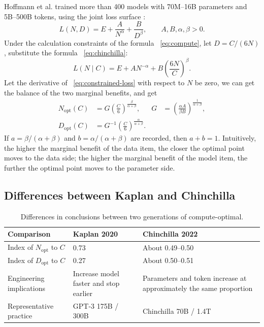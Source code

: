 \documentclass[UTF8,10pt,a4paper,fontset=none]{ctexart}
\begin{document}
Hoffmann et al. trained more than 400 models with 70M--16B parameters and 5B--500B tokens, using the joint loss surface \cite{hoffmann2022}:
\begin{equation}
  L(N,D)=E+\frac{A}{N^{\alpha}}+\frac{B}{D^{\beta}},
  \qquad A,B,\alpha,\beta>0.
  \label{eq:chinchilla}
\end{equation}
Under the calculation constraints of the formula ~\eqref{eq:compute}, let $D=C/(6N)$, substitute the formula ~\eqref{eq:chinchilla}:
\begin{equation}
  L(N\mid C)=E+A N^{-\alpha}
  +B\left(\frac{6N}{C}\right)^{\beta}.
  \label{eq:constrained-loss}
\end{equation}
Let the derivative of ~\eqref{eq:constrained-loss} with respect to $N$ be zero, we can get the balance of the two marginal benefits, and get
\begin{align}
  N_{\mathrm{opt}}(C)
  &=G\left(\frac{C}{6}\right)^{\frac{\beta}{\alpha+\beta}},
  &G&=\left(\frac{\alpha A}{\beta B}\right)^{\frac{1}{\alpha+\beta}},
  \label{eq:nopt}\\
  D_{\mathrm{opt}}(C)
  &=G^{-1}\left(\frac{C}{6}\right)^{\frac{\alpha}{\alpha+\beta}}.
  \label{eq:dopt}
\end{align}
If $a=\beta/(\alpha+\beta)$ and $b=\alpha/(\alpha+\beta)$ are recorded, then $a+b=1$. Intuitively, the higher the marginal benefit of the data item, the closer the optimal point moves to the data side; the higher the marginal benefit of the model item, the further the optimal point moves to the parameter side.

\subsection{Differences between Kaplan and Chinchilla}

\begin{table}[htbp]
\centering
\caption{Differences in conclusions between two generations of compute-optimal.}
\label{tab:kaplan-chinchilla}
\begin{tabularx}{\textwidth}{Y C{3.2cm} C{3.2cm}}
\toprule
Comparison & Kaplan 2020 & Chinchilla 2022 \\
\midrule
Index of $N_{\mathrm{opt}}$ to $C$ & 0.73 & About 0.49--0.50 \\
Index of $D_{\mathrm{opt}}$ to $C$ & 0.27 & About 0.50--0.51 \\
Engineering implications & Increase model faster and stop earlier & Parameters and token increase at approximately the same proportion \\
Representative practice & GPT-3 175B / 300B & Chinchilla 70B / 1.4T \\
\bottomrule
\end{tabularx}
\end{table}
\end{document}

